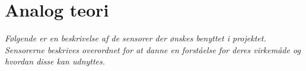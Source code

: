 \section{Analog teori}
\textit{Følgende er en beskrivelse af de sensorer der ønskes benyttet i projektet. Sensorerne beskrives overordnet for at danne en forståelse for deres virkemåde og hvordan disse kan udnyttes.}